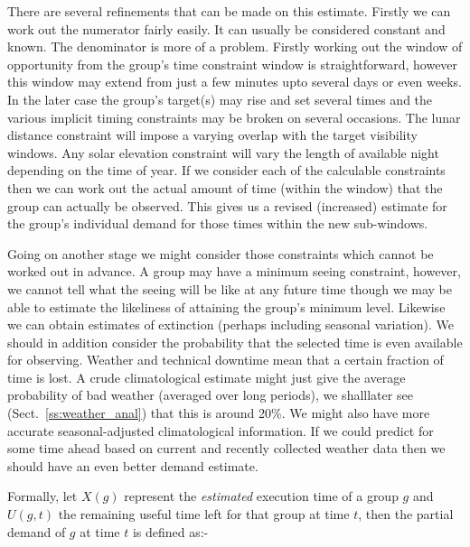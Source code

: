 There are several refinements that can be made on this estimate. Firstly we can work out the numerator fairly easily. It can usually be considered constant and known. The denominator is more of a problem. Firstly working out the window of opportunity from the group's time constraint window is straightforward, however this window may extend from just a few minutes upto several days or even weeks. In the later case the group's target(s) may rise and set several times and the various implicit timing constraints may be broken on several occasions. The lunar distance constraint will impose a varying overlap with the target visibility windows. Any solar elevation constraint will vary the length of available night depending on the time of year. If we consider each of the calculable constraints then we can work out the actual amount of time (within the window) that the group can actually be observed. This gives us a revised (increased) estimate for the group's individual demand for those times within the new sub-windows. 

Going on another stage we might consider those constraints which cannot be worked out in advance. A group may have a minimum seeing constraint, however, we cannot tell what the seeing will be like at any future time though we may be able to estimate the likeliness of attaining the group's minimum level. Likewise we can obtain estimates of extinction (perhaps including seasonal variation). We should in addition consider the probability that the selected time is even available for observing. Weather and technical downtime mean that a certain fraction of time is lost. A crude climatological estimate might just give the average probability of bad weather (averaged over long periods), we shalllater see (Sect.~\ref{ss:weather_anal}) that this is around 20\%. We might also have more accurate seasonal-adjusted climatological information. If we could predict for some time ahead based on current and recently collected weather data then we should have an even better demand estimate. 

Formally, let $X(g)$ represent the \emph{estimated} execution time of a group $g$ and $U(g,t)$ the remaining useful time left for that group at time $t$, then the partial demand of $g$ at time $t$ is defined as:-



